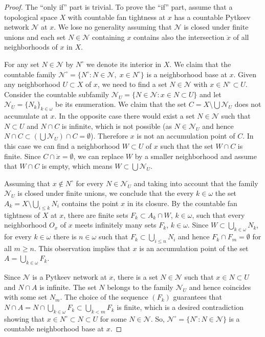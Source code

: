 \documentclass{amsart}
\theoremstyle{definition}
\begin{document}
\begin{proof}  The ``only if'' part is trivial. To prove the ``if'' part, assume that a topological space $X$ with countable fan tightness at $x$ has a countable Pytkeev network $\mathcal N$ at $x$.
We lose no generality assuming that $\mathcal N$ is closed under finite unions and each set $N\in\mathcal N$ containing $x$ contains also the intersection $\ddot x$ of all neighborhoods of $x$ in $X$.

For any set $N\in\mathcal N$ by $N^\circ$ we denote its interior in $X$. We claim that the countable family ${\mathcal N}^\circ=\{N^\circ:N\in\mathcal N,\;x\in N^\circ\}$ is a neighborhood base at $x$. Given any neighborhood $U\subset X$ of $x$, we need to find a set $N\in\mathcal N$ with $x\in N^\circ\subset U$. Consider the countable subfamily $\mathcal N_U=\{N\in\mathcal N\colon x\in N\subset U\}$ and let $\mathcal N_U=\{N_k\}_{k\in{\omega}}$ be its enumeration. We claim that the set  $C=X\setminus\bigcup\mathcal N_U$ does not accumulate at $x$. In the opposite case there would exist a set $N\in\mathcal N$ such that $N\subset U$ and $N\cap C$ is infinite, which is not possible (as $N\in\mathcal N_U$ and hence $N\cap C\subset (\bigcup\mathcal N_U)\cap C=\emptyset$). Therefore $x$ is not an accumulation point of $C$. In this case we can find a neighborhood $W\subset U$ of $x$ such that the set $W\cap C$ is finite. Since $C\cap\ddot x=\emptyset$, we can replace $W$ by a smaller neighborhood and assume that $W\cap C$ is empty, which means $W\subset \bigcup\mathcal N_U$.
\smallskip

Assuming that $x\notin N^\circ$ for every $N\in\mathcal N_U$ and taking into account that the family $\mathcal N_U$ is closed under finite unions, we conclude that the every $k\in{\omega}$ the set $A_k=X\setminus \bigcup_{i\le k}N_i$ contains the point $x$ in its closure.
By the countable fan tightness of $X$ at $x$, there are finite sets $F_k\subset A_k\cap W$, $k\in{\omega}$, such that every neighborhood $O_x$ of $x$ meets infinitely many sets $F_k$, $k\in{\omega}$. Since $W\subset \bigcup_{k\in{\omega}}N_k$, for every $k\in{\omega}$ there is $n\in{\omega}$ such that $F_k\subset \bigcup_{i\le n}N_i$ and hence $F_k\cap F_m=\emptyset$ for all $m\ge n$. This observation implies that $x$ is an accumulation point of the set $A=\bigcup_{k\in{\omega}}F_k$.

Since $\mathcal N$ is a Pytkeev network at $x$, there is a set $N\in\mathcal N$ such that $x\in N\subset U$ and $N\cap A$ is infinite. The set $N$ belongs to the family $\mathcal N_U$ and hence coincides with some set $N_m$. The choice of the sequence $(F_k)$ guarantees that $N\cap A=N\cap\bigcup_{k\in{\omega}}F_k\subset \bigcup_{k<m}F_k$ is finite, which is a desired contradiction showing that $x\in N^\circ\subset N\subset U$ for some $N\in\mathcal N$. So, $\mathcal N^\circ=\{N^\circ:N\in\mathcal N\}$ is a countable neighborhood base at $x$.
\end{proof}
\end{document}
